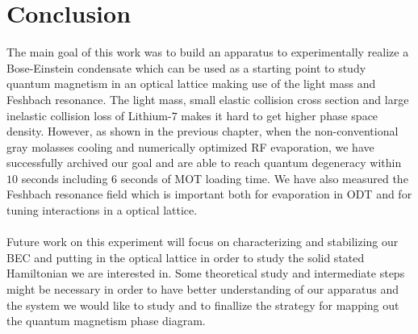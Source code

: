 \chapter*{Conclusion}

The main goal of this work was to build an apparatus to experimentally realize a Bose-Einstein condensate which can be used as a starting point to study quantum magnetism in an optical lattice making use of the light mass and Feshbach resonance. The light mass, small elastic collision cross section and large inelastic collision loss of Lithium-$7$ makes it hard to get higher phase space density. However, as shown in the previous chapter, when the non-conventional gray molasses cooling and numerically optimized RF evaporation, we have successfully archived our goal and are able to reach quantum degeneracy within $10$ seconds including $6$ seconds of MOT loading time. We have also measured the Feshbach resonance field which is important both for evaporation in ODT and for tuning interactions in a optical lattice.\\
\\
Future work on this experiment will focus on characterizing and stabilizing our BEC and putting in the optical lattice in order to study the solid stated Hamiltonian we are interested in. Some theoretical study and intermediate steps might be necessary in order to have better understanding of our apparatus and the system we would like to study and to finallize the strategy for mapping out the quantum magnetism phase diagram.

